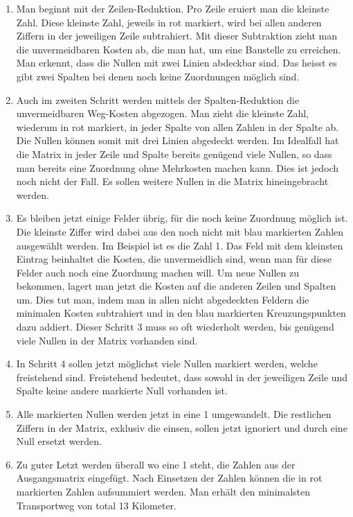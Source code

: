 \begin{enumerate}
\item Man beginnt mit der Zeilen-Reduktion. Pro Zeile eruiert man die kleinste Zahl. Diese kleinste Zahl, jeweils in rot markiert, wird bei allen anderen Ziffern in der jeweiligen Zeile subtrahiert. Mit dieser Subtraktion zieht man die unvermeidbaren Kosten ab, die man hat, um eine Baustelle zu erreichen. Man erkennt, dass die Nullen mit zwei Linien abdeckbar sind. Das heisst es gibt zwei Spalten bei denen noch keine Zuordnungen möglich sind. 

\item Auch im zweiten Schritt werden mittels der Spalten-Reduktion die unvermeidbaren Weg-Kosten abgezogen. Man zieht die kleinste Zahl, wiederum in rot markiert, in jeder Spalte von allen Zahlen in der Spalte ab.
Die Nullen können somit mit drei Linien abgedeckt werden. Im Idealfall hat die Matrix in jeder Zeile und Spalte bereits genügend viele Nullen, so dass man bereits eine Zuordnung ohne Mehrkosten machen kann. Dies ist jedoch noch nicht der Fall. Es sollen weitere Nullen in die Matrix hineingebracht werden.

\item Es bleiben jetzt einige Felder übrig, für die noch keine Zuordnung möglich ist. Die kleinste Ziffer wird dabei aus den noch nicht mit blau markierten Zahlen ausgewählt werden. Im Beispiel ist es die Zahl 1. Das Feld mit dem kleinsten Eintrag beinhaltet die Kosten, die unvermeidlich sind, wenn man für diese Felder auch noch eine Zuordnung machen will. Um neue Nullen zu bekommen, lagert man jetzt die Kosten auf die anderen Zeilen und Spalten um. Dies tut man, indem man in allen nicht abgedeckten Feldern die minimalen Kosten subtrahiert und in den blau markierten Kreuzungspunkten dazu addiert.
Dieser Schritt 3 muss so oft wiederholt werden, bis genügend viele Nullen in der Matrix vorhanden sind.

\item In Schritt 4 sollen jetzt möglichst viele Nullen markiert werden, welche freistehend sind.
Freistehend bedeutet, dass sowohl in der jeweiligen Zeile und Spalte keine andere markierte Null vorhanden ist.

\item Alle markierten Nullen werden jetzt in eine 1 umgewandelt. Die restlichen Ziffern in der Matrix, exklusiv die einsen, sollen jetzt ignoriert und durch eine Null ersetzt werden.

\item Zu guter Letzt werden überall wo eine 1 steht, die Zahlen aus der Ausgangsmatrix eingefügt. Nach Einsetzen der Zahlen können die in rot markierten Zahlen aufsummiert werden. Man erhält den minimalsten Transportweg von total 13 Kilometer.
\end{enumerate}

